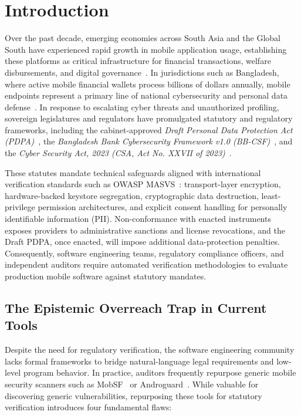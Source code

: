 \section{Introduction}
\label{sec:intro}

Over the past decade, emerging economies across South Asia and the Global South have experienced rapid growth in mobile application usage, establishing these platforms as critical infrastructure for financial transactions, welfare disbursements, and digital governance~\cite{chen_fintech_asia, worldbank_fintech_bd}. In jurisdictions such as Bangladesh, where active mobile financial wallets process billions of dollars annually, mobile endpoints represent a primary line of national cybersecurity and personal data defense~\cite{reaves_mfs}. In response to escalating cyber threats and unauthorized profiling, sovereign legislatures and regulators have promulgated statutory and regulatory frameworks, including the cabinet-approved \textit{Draft Personal Data Protection Act (PDPA)}~\cite{bd_pdpa_2026}, the \textit{Bangladesh Bank Cybersecurity Framework v1.0 (BB-CSF)}~\cite{bb_csf_2025}, and the \textit{Cyber Security Act, 2023 (CSA, Act No. XXVII of 2023)}~\cite{bd_csa_2026}.

These statutes mandate technical safeguards aligned with international verification standards such as OWASP MASVS~\cite{owasp_masvs}: transport-layer encryption, hardware-backed keystore segregation, cryptographic data destruction, least-privilege permission architectures, and explicit consent handling for personally identifiable information (PII). Non-conformance with enacted instruments exposes providers to administrative sanctions and license revocations, and the Draft PDPA, once enacted, will impose additional data-protection penalties. Consequently, software engineering teams, regulatory compliance officers, and independent auditors require automated verification methodologies to evaluate production mobile software against statutory mandates.

\subsection{The Epistemic Overreach Trap in Current Tools}
\label{sec:intro:dilemma}

Despite the need for regulatory verification, the software engineering community lacks formal frameworks to bridge natural-language legal requirements and low-level program behavior. In practice, auditors frequently repurpose generic mobile security scanners such as MobSF~\cite{mobsf} or Androguard~\cite{androguard}. While valuable for discovering generic vulnerabilities, repurposing these tools for statutory verification introduces four fundamental flaws:

